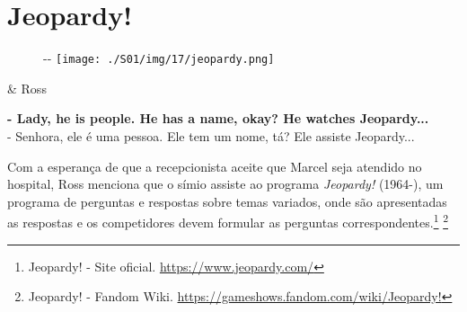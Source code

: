 \hypertarget{jeopardy}{%
\section{Jeopardy!}\label{jeopardy}}

\begin{figure}[!ht]
  \begin{adjustwidth}{-\oddsidemargin-1in}{-\rightmargin}
    \centering
    \texttt{[image: ./S01/img/17/jeopardy.png]}
  \end{adjustwidth}
\end{figure}

\begin{tcolorbox}[enhanced,center upper,
    drop fuzzy shadow southeast, boxrule=0.3pt,
    lower separated=false, breakable,
    colframe=black!30!dialogoBorder,colback=white]
\begin{minipage}[c]{0.16\linewidth}
   & \centering \scriptsize{Ross}
\end{minipage}
\hfill
\begin{minipage}[c]{0.8\linewidth}
  \textbf{- Lady, he is people. He has a name, okay? He watches Jeopardy...}\\
  - Senhora, ele é uma pessoa. Ele tem um nome, tá? Ele assiste Jeopardy...
\end{minipage}
\end{tcolorbox}

Com a esperança de que a recepcionista aceite que Marcel seja atendido
no hospital, Ross menciona que o símio assiste ao programa
\emph{Jeopardy!} (1964-), um programa de perguntas e respostas sobre
temas variados, onde são apresentadas as respostas e os competidores
devem formular as perguntas correspondentes.\footnote{\sloppy Jeopardy! - Site oficial. \url{https://www.jeopardy.com/}}
\footnote{\sloppy Jeopardy! - Fandom Wiki. \url{https://gameshows.fandom.com/wiki/Jeopardy!}}
